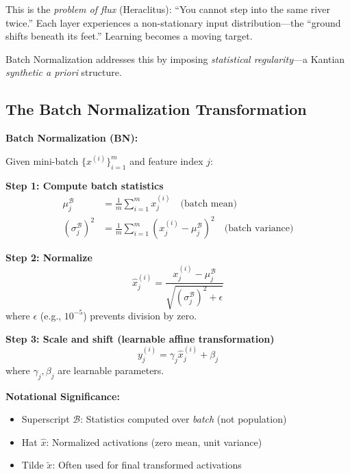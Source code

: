 \begin{philosophical}
	This is the \textit{problem of flux} (Heraclitus): ``You cannot step into the same river twice.'' Each layer experiences a non-stationary input distribution---the ``ground shifts beneath its feet.'' Learning becomes a moving target.
	
	Batch Normalization addresses this by imposing \textit{statistical regularity}---a Kantian \textit{synthetic a priori} structure.
\end{philosophical}

\subsection{The Batch Normalization Transformation}

\begin{seanbox}{3.5}
	\textbf{Batch Normalization (BN):}
	
	Given mini-batch $\{x^{(i)}\}_{i=1}^m$ and feature index $j$:
	
	\textbf{Step 1: Compute batch statistics}
	\begin{align}
		\mu_j^{\mathcal{B}} &= \frac{1}{m} \sum_{i=1}^m x_j^{(i)} \quad \text{(batch mean)} \\
		(\sigma_j^{\mathcal{B}})^2 &= \frac{1}{m} \sum_{i=1}^m (x_j^{(i)} - \mu_j^{\mathcal{B}})^2 \quad \text{(batch variance)}
	\end{align}
	
	\textbf{Step 2: Normalize}
	\begin{equation}
		\hat{x}_j^{(i)} = \frac{x_j^{(i)} - \mu_j^{\mathcal{B}}}{\sqrt{(\sigma_j^{\mathcal{B}})^2 + \epsilon}}
	\end{equation}
	where $\epsilon$ (e.g., $10^{-5}$) prevents division by zero.
	
	\textbf{Step 3: Scale and shift (learnable affine transformation)}
	\begin{equation}
		y_j^{(i)} = \gamma_j \hat{x}_j^{(i)} + \beta_j
	\end{equation}
	where $\gamma_j, \beta_j$ are learnable parameters.
	
	\textbf{Notational Significance:}
	\begin{itemize}
		\item Superscript $\mathcal{B}$: Statistics computed over \textit{batch} (not population)
		\item Hat $\hat{x}$: Normalized activations (zero mean, unit variance)
		\item Tilde $\tilde{x}$: Often used for final transformed activations
	\end{itemize}
\end{seanbox}

